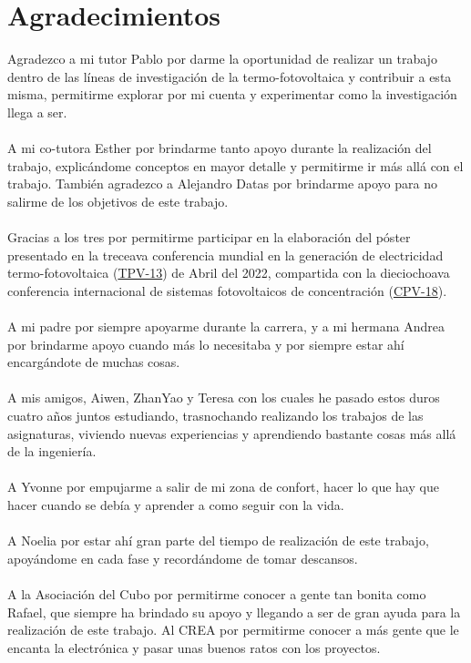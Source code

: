 \chapter{Agradecimientos}

Agradezco a mi tutor Pablo por darme la oportunidad de realizar un trabajo dentro de las líneas de investigación de la termo-fotovoltaica y contribuir a esta misma, permitirme explorar por mi cuenta y experimentar como la investigación llega a ser.\\\\
A mi co-tutora Esther por brindarme tanto apoyo durante la realización del trabajo, explicándome conceptos en mayor detalle y permitirme ir más allá con el trabajo. También agradezco a Alejandro Datas por brindarme apoyo para no salirme de los objetivos de este trabajo.\\\\
Gracias a los tres por permitirme participar en la elaboración del póster presentado en la treceava conferencia mundial en la generación de electricidad termo-fotovoltaica (\href{https://www.tpv-13.org/}{TPV-13}) de Abril del 2022, compartida con la dieciochoava conferencia internacional de sistemas fotovoltaicos de concentración (\href{https://www.cpv-18.org/}{CPV-18}).\\\\  
A mi padre por siempre apoyarme durante la carrera, y a mi hermana Andrea por brindarme apoyo cuando más lo necesitaba y por siempre estar ahí encargándote de muchas cosas.\\\\
A mis amigos, Aiwen, ZhanYao y Teresa con los cuales he pasado estos duros cuatro años juntos estudiando, trasnochando realizando los trabajos de las asignaturas, viviendo nuevas experiencias y aprendiendo bastante cosas más allá de la ingeniería.\\\\
A Yvonne por empujarme a salir de mi zona de confort, hacer lo que hay que hacer cuando se debía y aprender a como seguir con la vida.\\\\
A Noelia por estar ahí gran parte del tiempo de realización de este trabajo, apoyándome en cada fase y recordándome de tomar descansos.\\\\
A la Asociación del Cubo por permitirme conocer a gente tan bonita como Rafael, que siempre ha brindado su apoyo y llegando a ser de gran ayuda para la realización de este trabajo. Al CREA por permitirme conocer a más gente que le encanta la electrónica y pasar unas buenos ratos con los proyectos.\\\\